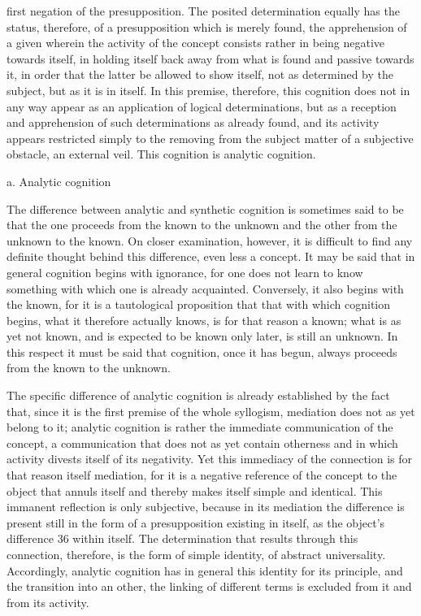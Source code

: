 first negation of the presupposition. The posited determination equally
has the status, therefore, of a presupposition which is merely found, the
apprehension of a given wherein the activity of the concept consists rather
in being negative towards itself, in holding itself back away from what is
found and passive towards it, in order that the latter be allowed to show
itself, not as determined by the subject, but as it is in itself.
In this premise, therefore, this cognition does not in any way appear as an
application of logical determinations, but as a reception and apprehension
of such determinations as already found, and its activity appears restricted
simply to the removing from the subject matter of a subjective obstacle, an
external veil. This cognition is analytic cognition.

a. Analytic cognition

The difference between analytic and synthetic cognition is sometimes said
to be that the one proceeds from the known to the unknown and the other
from the unknown to the known. On closer examination, however, it is
difficult to find any definite thought behind this difference, even less a
concept. It may be said that in general cognition begins with ignorance,
for one does not learn to know something with which one is already
acquainted. Conversely, it also begins with the known, for it is a tautological
proposition that that with which cognition begins, what it therefore actually
knows, is for that reason a known; what is as yet not known, and is expected
to be known only later, is still an unknown. In this respect it must be said
that cognition, once it has begun, always proceeds from the known to the
unknown.

The specific difference of analytic cognition is already established by the
fact that, since it is the first premise of the whole syllogism, mediation
does not as yet belong to it; analytic cognition is rather the immediate
communication of the concept, a communication that does not as yet
contain otherness and in which activity divests itself of its negativity. Yet
this immediacy of the connection is for that reason itself mediation, for it
is a negative reference of the concept to the object that annuls itself and
thereby makes itself simple and identical. This immanent reflection is only
subjective, because in its mediation the difference is present still in the
form of a presupposition existing in itself, as the object’s difference 36 within
itself. The determination that results through this connection, therefore,
is the form of simple identity, of abstract universality. Accordingly, analytic
cognition has in general this identity for its principle, and the transition
into an other, the linking of different terms is excluded from it and from
its activity.

